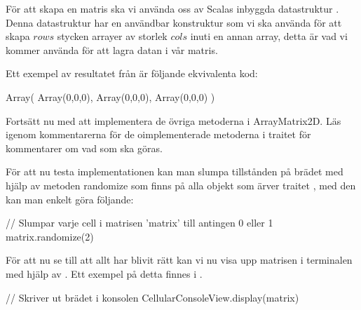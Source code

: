 
        För att skapa en matris ska vi använda oss av Scalas inbyggda datastruktur . Denna datastruktur har en användbar konstruktur  som vi ska använda för att skapa $rows$ stycken arrayer av storlek $cols$ inuti en annan array, detta är vad vi kommer använda för att lagra datan i vår matris.
        
        Ett exempel av resultatet från  är följande ekvivalenta kod:

\begin{Code}
Array(
	Array(0,0,0),
	Array(0,0,0),
	Array(0,0,0)	
)
\end{Code}




		Fortsätt nu med att implementera de övriga metoderna i ArrayMatrix2D. Läs igenom kommentarerna för de oimplementerade metoderna i traitet  för kommentarer om vad som ska göras.
		


        För att nu testa implementationen kan man slumpa tillstånden på brädet med hjälp av metoden randomize som finns på alla objekt som ärver traitet , med den kan man enkelt göra följande:

\begin{Code}
// Slumpar varje cell i matrisen 'matrix' till antingen 0 eller 1
matrix.randomize(2)
\end{Code}

        För att nu se till att allt har blivit rätt kan vi nu visa upp matrisen i terminalen med hjälp av . Ett exempel på detta finnes i .

\begin{Code}
// Skriver ut brädet i konsolen
CellularConsoleView.display(matrix)
\end{Code}

